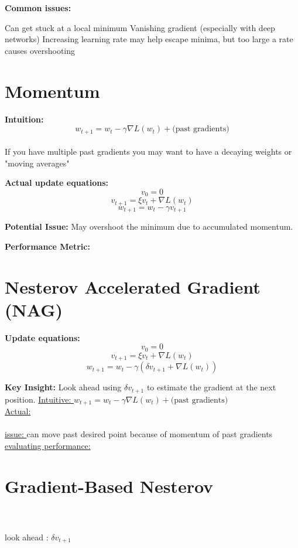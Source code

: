 \vspace{1em}
\textbf{Common issues:}
\begin{outline}
    \1 Can get stuck at a local minimum
    \1 Vanishing gradient (especially with deep networks)
    \1 Increasing learning rate may help escape minima, but too large a rate causes overshooting
\end{outline}

\section{Momentum}


\textbf{Intuition:}
\[
    w_{t+1} = w_t - \gamma \nabla L(w_t) + \text{(past gradients)}
\]
\\ If you have multiple past gradients you may want to have a decaying weights or "moving averages"

\textbf{Actual update equations:}
\[
    v_0 = 0
\]
\[
    v_{t+1} = \xi v_t + \nabla L(w_t)
\]
\[
    w_{t+1} = w_t - \gamma v_{t+1}
\]

\textbf{Potential Issue:} May overshoot the minimum due to accumulated momentum.

\textbf{Performance Metric:}  

\section{Nesterov Accelerated Gradient (NAG)}

\textbf{Update equations:}
\[
    v_0 = 0
\]
\[
    v_{t+1} = \xi v_t + \nabla L(w_t)
\]
\[
    w_{t+1} = w_t - \gamma (\delta v_{t+1} + \nabla L(w_t))
\]

\textbf{Key Insight:} Look ahead using $\delta v_{t+1}$ to estimate the gradient at the next position.
\underline{Intuitive: } $w_{t+1}=w_t-\gamma \nabla L(w_t) + \text{(past gradients)}$\\
\underline{Actual: }\\ 
\\
\underline{issue: } can move past desired point because of momentum of past gradients\\
\underline{evaluating performance: } \\

\section{Gradient-Based Nesterov}
\\
\\
look ahead : $\delta v_{t+1}$
